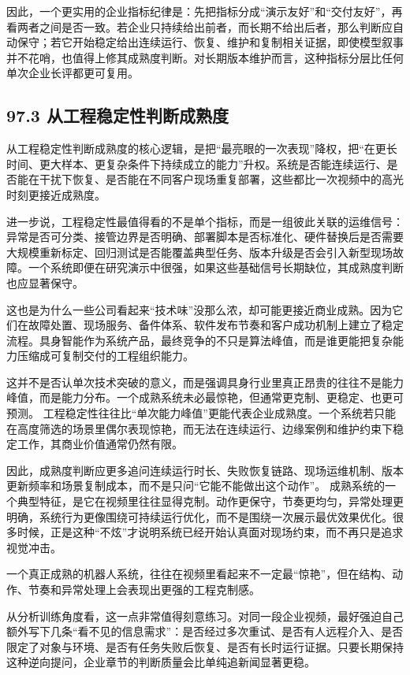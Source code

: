 因此，一个更实用的企业指标纪律是：先把指标分成“演示友好”和“交付友好”，再看两者之间是否一致。若企业只持续给出前者，而长期不给出后者，那么判断应自动保守；若它开始稳定给出连续运行、恢复、维护和复制相关证据，即使模型叙事并不花哨，也值得上修其成熟度判断。对长期版本维护而言，这种指标分层比任何单次企业长评都更可复用。

\subsection*{97.3 从工程稳定性判断成熟度}


从工程稳定性判断成熟度的核心逻辑，是把“最亮眼的一次表现”降权，把“在更长时间、更大样本、更复杂条件下持续成立的能力”升权。系统是否能连续运行、是否能在干扰下恢复、是否能在不同客户现场重复部署，这些都比一次视频中的高光时刻更接近成熟度。

进一步说，工程稳定性最值得看的不是单个指标，而是一组彼此关联的运维信号：异常是否可分类、接管边界是否明确、部署脚本是否标准化、硬件替换后是否需要大规模重新标定、回归测试是否能覆盖典型任务、版本升级是否会引入新型现场故障。一个系统即便在研究演示中很强，如果这些基础信号长期缺位，其成熟度判断也应显著保守。

这也是为什么一些公司看起来“技术味”没那么浓，却可能更接近商业成熟。因为它们在故障处置、现场服务、备件体系、软件发布节奏和客户成功机制上建立了稳定流程。具身智能作为系统产品，最终竞争的不只是算法峰值，而是谁更能把复杂能力压缩成可复制交付的工程组织能力。

这并不是否认单次技术突破的意义，而是强调具身行业里真正昂贵的往往不是能力峰值，而是能力分布。一个成熟系统未必最惊艳，但通常更克制、更稳定、也更可预测。 工程稳定性往往比“单次能力峰值”更能代表企业成熟度。一个系统若只能在高度筛选的场景里偶尔表现惊艳，而无法在连续运行、边缘案例和维护约束下稳定工作，其商业价值通常仍然有限。

因此，成熟度判断应更多追问连续运行时长、失败恢复链路、现场运维机制、版本更新频率和场景复制成本，而不是只问“它能不能做出这个动作”。 成熟系统的一个典型特征，是它在视频里往往显得克制。动作更保守，节奏更均匀，异常处理更明确，系统行为更像围绕可持续运行优化，而不是围绕一次展示最优效果优化。很多时候，正是这种“不炫”才说明系统已经开始认真面对现场约束，而不再只是追求视觉冲击。

一个真正成熟的机器人系统，往往在视频里看起来不一定最“惊艳”，但在结构、动作、节奏和异常处理上会表现出更强的工程克制感。

从分析训练角度看，这一点非常值得刻意练习。对同一段企业视频，最好强迫自己额外写下几条“看不见的信息需求”：是否经过多次重试、是否有人远程介入、是否限定了对象与环境、是否有任务失败后恢复、是否有长时运行证据。只要长期保持这种逆向提问，企业章节的判断质量会比单纯追新闻显著更稳。

